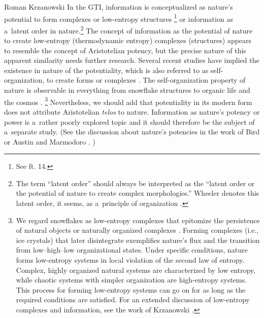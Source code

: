 \begin{artengenv}{Roman Krzanowski}
In the GTI, information is conceptualized as nature's potential to form complexes or low-entropy structures 
\parencite[see][]{krzanowski_inquiry_2023}%
\footnote{See ft. 14.} or information as a~latent order in nature.\footnote{The term ``latent order'' should always be interpreted as the ``latent order or the potential of nature to create complex morphologies.'' Wheeler denotes this latent order, it seems, as a~principle of organization 
\parencite[][]{wheeler_information_1989}.%
} The concept of information as the potential of nature to create low-entropy (thermodynamic entropy) complexes (structures) appears to resemble the concept of Aristotelian potency, but the precise nature of this apparent similarity needs further research. Several recent studies have implied the existence in nature of the potentiality, which is also referred to as self-organization, to create forms or complexes 
\parencite[e.g][]{eigen_laws_1993}. %
 The self-organization property of nature is observable in everything from snowflake structures to organic life and the cosmos 
\parencites[e.g][]{reeves_heure_1986}[][]{schrodinger_what_2012}.%
\footnote{We regard snowflakes as low-entropy complexes that epitomize the persistence of natural objects or naturally organized complexes 
\parencite[][]{reeves_heure_1986}. %
 Forming complexes (i.e., ice crystals) that later disintegrate exemplifies nature's flux and the transition from low–high–low organizational states. Under specific conditions, nature forms low-entropy systems in local violation of the second law of entropy. Complex, highly organized natural systems are characterized by low entropy, while chaotic systems with simpler organization are high-entropy systems. This process for forming low-entropy systems can go on for as long as the required conditions are satisfied. For an extended discussion of low-entropy complexes and information, see the work of Krzanowski 
\parencite*[][]{krzanowski_inquiry_2023}.%
} Nevertheless, we should add that potentiality in its modern form does not attribute Aristotelian \textit{telos} to nature. Information as nature's potency or power is a~rather poorly explored topic and it should therefore be the subject of a~separate study. (See the discussion about nature's potencies in the work of Bird 
\parencite*[][]{bird_natures_2007} %
 or Austin and Marmodoro 
\parencite*[][]{simpson_structural_2017}.%
)




\end{artengenv}
